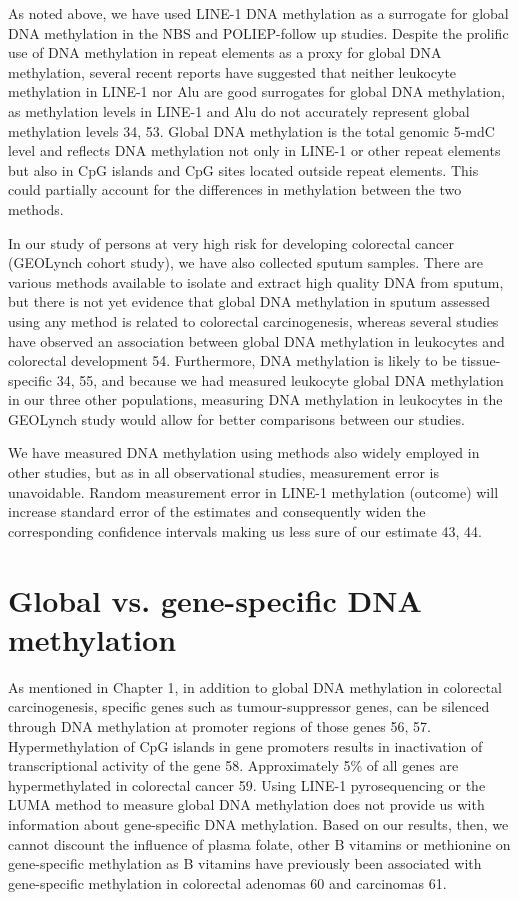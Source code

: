 \noindent As noted above, we have used LINE-1 DNA methylation as a surrogate for global DNA methylation in the NBS and POLIEP-follow up studies. Despite the prolific use of DNA methylation in repeat elements as a proxy for global DNA methylation, several recent reports have suggested that neither leukocyte methylation in LINE-1 nor Alu are good surrogates for global DNA methylation, as methylation levels in LINE-1 and Alu do not accurately represent global methylation levels 34, 53. Global DNA methylation is the total genomic 5-mdC level and reflects DNA methylation not only in LINE-1 or other repeat elements but also in CpG islands and CpG sites located outside repeat elements. This could partially account for the differences in methylation between the two methods. 
 
\noindent In our study of persons at very high risk for developing colorectal cancer (GEOLynch cohort study), we have also collected sputum samples. There are various methods available to isolate and extract high quality DNA from sputum, but there is not yet evidence that global DNA methylation in sputum assessed using any method is related to colorectal carcinogenesis, whereas several studies have observed an association between global DNA methylation in leukocytes and colorectal development 54. Furthermore, DNA methylation is likely to be tissue-specific 34, 55, and because we had measured leukocyte global DNA methylation in our three other populations, measuring DNA methylation in leukocytes in the GEOLynch study would allow for better comparisons between our studies. 
 
\noindent We have measured DNA methylation using methods also widely employed in other studies, but as in all observational studies, measurement error is unavoidable. Random measurement error in LINE-1 methylation (outcome) will increase standard error of the estimates and consequently widen the corresponding confidence intervals making us less sure of our estimate 43, 44. 
 
\section{Global vs. gene-specific DNA methylation} %
As mentioned in Chapter 1, in addition to global DNA methylation in colorectal carcinogenesis, specific genes such as tumour-suppressor genes, can be silenced through DNA methylation at promoter regions of those genes 56, 57. Hypermethylation of CpG islands in gene promoters results in inactivation of transcriptional activity of the gene 58. Approximately 5\% of all genes are hypermethylated in colorectal cancer 59. Using LINE-1 pyrosequencing or the LUMA method to measure global DNA methylation does not provide us with information about gene-specific DNA methylation. Based on our results, then, we cannot discount the influence of plasma folate, other B vitamins or methionine on gene-specific methylation as B vitamins have previously been associated with gene-specific methylation in colorectal adenomas 60 and carcinomas 61. 
 
